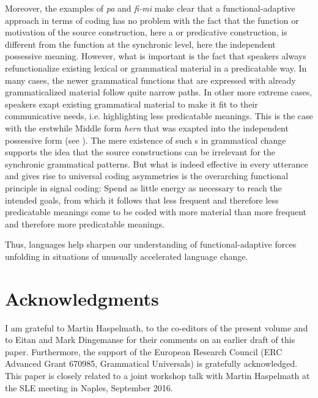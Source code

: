 \documentclass[output=paper]{langsci/langscibook}
\begin{document}
Moreover, the examples of  \textit{pa} and  \textit{fi-mi} make clear that a functional-adaptive approach in terms of coding  has no problem with the fact that the function or motivation of the source construction, here a  or predicative construction, is different from the function at the synchronic level, here the independent possessive meaning. However, what is important is the fact that speakers always refunctionalize existing lexical or grammatical material in a predicatable way. In many cases, the newer grammatical functions that are expressed with already grammaticalized material follow quite narrow  paths. In other more extreme cases, speakers exapt existing grammatical material to make it fit to their communicative needs, i.e. highlighting less predicatable meanings. This is the case with the erstwhile Middle    form \textit{hern} that was exapted into the independent possessive form (see ). The mere existence of such s in grammatical change supports the idea that the source constructions can be irrelevant for the synchronic grammatical patterns. But what is indeed effective in every utterance and gives rise to universal coding asymmetries is the overarching functional  principle in signal coding: Spend as little energy as necessary to reach the intended goals, from which it follows that less frequent and therefore less predicatable meanings come to be coded with more material than more frequent and therefore more predicatable meanings.

Thus,  languages help sharpen our understanding of functional-adaptive forces unfolding in situations of unusually accelerated language change.

\section*{Acknowledgments}

I am grateful to Martin Haspelmath, to the co-editors of the present volume and to Eitan  and Mark Dingemanse for their comments on an earlier draft of this paper. Furthermore, the support of the European Research Council (ERC Advanced Grant 670985, Grammatical Universals) is gratefully acknowledged. This paper is closely related to a joint workshop talk with Martin Haspelmath at the SLE meeting in Naples, September 2016.
\end{document}
